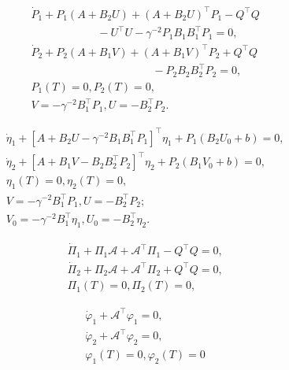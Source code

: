 \documentclass[10pt,a4paper]{amsart}
\begin{document}
\begin{align}
	&\dot{P}_1 + P_1(A + B_2U) + (A + B_2U)^{\top}P_1 - Q^{\top}Q \nonumber\\
	&\qquad \qquad \qquad - U^{\top}U - \gamma^{-2}P_1 B_1 B_1^{\top} P_1 = 0, \label{eq:5.1}\\
	&\dot{P}_2 + P_2(A + B_1V) + (A + B_1V)^{\top}P_2 + Q^{\top}Q \nonumber\\
	&\qquad\qquad\qquad\qquad\qquad\quad - P_2 B_2 B_2^{\top} P_2 = 0, \label{eq:5.2}\\
	&P_1(T) = 0, P_2(T) = 0, \nonumber\\
	&V = -\gamma^{-2}B_1^{\top}P_1, U = -B_2^{\top}P_2. \nonumber
\end{align}

\begin{align}
	&\dot{\eta}_1 + [A + B_2U - \gamma^{-2}B_1B_1^{\top}P_1]^{\top}\eta_1 + P_1(B_2U_0 + b) = 0, \label{eq:5.3}\\
	&\dot{\eta}_2 + [A + B_1V - B_2B_2^{\top}P_2]^{\top}\eta_2 + P_2(B_1V_0 + b) = 0, \label{eq:5.4}\\
	&\eta_1(T) = 0, \eta_2(T) = 0, \nonumber\\
	&V = -\gamma^{-2}B_1^{\top}P_1, U = -B_2^{\top}P_2;\nonumber\\
	&V_0 = -\gamma^{-2}B_1^{\top}\eta_1, U_0 = -B_2^{\top}\eta_2. \label{eq:5.5}
\end{align}

\begin{align}
	&\dot{\Pi}_1 + \Pi_1\mathcal{A} + \mathcal{A}^{\top}\Pi_1 - Q^{\top}Q = 0, \label{eq:5.6}\\
	&\dot{\Pi}_2 + \Pi_2\mathcal{A} + \mathcal{A}^{\top}\Pi_2 + Q^{\top}Q = 0, \label{eq:5.7}\\
	&\Pi_1(T) = 0, \Pi_2(T) = 0, \nonumber
\end{align}

\begin{align}
	&\dot{\varphi}_1 + \mathcal{A}^{\top}\varphi_1 = 0, \label{eq:5.8}\\
	&\dot{\varphi}_2 + \mathcal{A}^{\top}\varphi_2 = 0, \label{eq:5.9}\\
	&\varphi_1(T) = 0, \varphi_2(T) = 0 \nonumber
\end{align}
\end{document}
